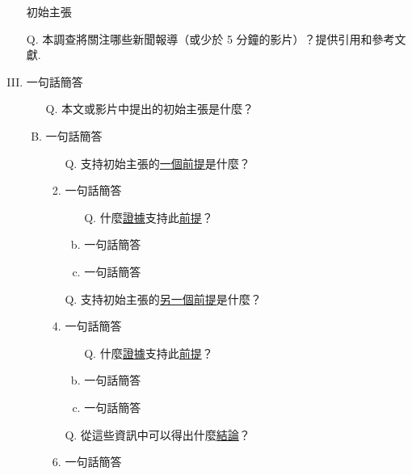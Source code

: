 \documentclass[a4paper, 12pt]{article}
\begin{document}
\begin{enumerate}[I.]
    \item[]{\color{blue}初始主張}
    \item[Q.] 本調查將關注哪些新聞報導（或少於 5 分鐘的影片）？提供引用和參考文獻.
    \item{\color{gray}一句話簡答} %
          \begin{enumerate}[A.]
              \item [Q.]本文或影片中提出的{\color{blue}初始主張}是什麼？
              \item {\color{gray}一句話簡答} %
                    \begin{enumerate}[1.]
                        \item[Q.] 支持{\color{blue}初始主張}的{\underline{一個前提}}是什麼？
                        \item{\color{gray}一句話簡答} %
                              \begin{enumerate}[a.]
                                  \item [Q.] 什麼{\underline{證據}}支持此{\underline{前提}}？
                                  \item {\color{gray}一句話簡答} %
                                  \item {\color{gray}一句話簡答} %
                              \end{enumerate}
                        \item [Q.]支持{\color{blue}初始主張}的{\underline{另一個前提}}是什麼？
                        \item{\color{gray}一句話簡答} %
                              \begin{enumerate}[a.]
                                  \item [Q.] 什麼{\underline{證據}}支持此{\underline{前提}}？
                                  \item {\color{gray}一句話簡答} %
                                  \item {\color{gray}一句話簡答} %
                              \end{enumerate}
                        \item [Q.]從這些資訊中可以得出什麼{\underline{結論}}？
                        \item {\color{gray}一句話簡答} %
                    \end{enumerate}

\end{enumerate}
\end{enumerate}
\end{document}
